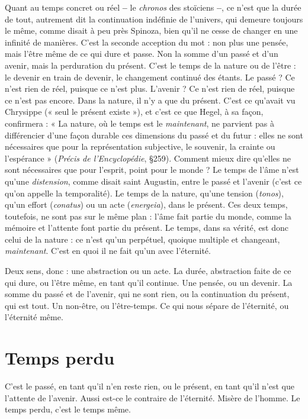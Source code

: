 Quant au temps concret ou réel {\bf --} le {\it chronos} des stoïciens {\bf --}, ce n’est que la
durée de tout, autrement dit la continuation indéfinie de l’univers, qui
demeure toujours le même, comme disait à peu près Spinoza, bien qu’il ne
cesse de changer en une infinité de manières. C’est la seconde acception du
mot : non plus une pensée, mais l'être même de ce qui dure et passe. Non la
somme d’un passé et d’un avenir, mais la perduration du présent. C’est le
temps de la nature ou de l’être : le devenir en train de devenir, le changement
continué des étants. Le passé ? Ce n’est rien de réel, puisque ce n’est plus.
L'avenir ? Ce n’est rien de réel, puisque ce n’est pas encore. Dans la nature, il
n’y a que du présent. C’est ce qu'avait vu Chrysippe (« seul le présent existe »),
et c’est ce que Hegel, à sa façon, confirmera : « La nature, où le temps est le
{\it maintenant}, ne parvient pas à différencier d’une façon durable ces dimensions
du passé et du futur : elles ne sont nécessaires que pour la représentation subjective,
le souvenir, la crainte ou l’espérance » ({\it Précis de l'Encyclopédie}, \S 259).
Comment mieux dire qu’elles ne sont nécessaires que pour l’esprit, point pour
le monde ? Le temps de l’âme n’est qu’une {\it distension}, comme disait saint
Augustin, entre le passé et l’avenir (c’est ce qu’on appelle la temporalité). Le
temps de la nature, qu’une tension ({\it tonos}), qu’un effort ({\it conatus}) ou un acte
({\it energeia}), dans le présent. Ces deux temps, toutefois, ne sont pas sur le même
plan : l’âme fait partie du monde, comme la mémoire et l'attente font partie du
présent. Le temps, dans sa vérité, est donc celui de la nature : ce n’est qu’un
perpétuel, quoique multiple et changeant, {\it maintenant}. C’est en quoi il ne fait
qu’un avec l'éternité.

Deux sens, donc : une abstraction ou un acte. La durée, abstraction faite de
ce qui dure, ou l’être même, en tant qu’il continue. Une pensée, ou un devenir.
La somme du passé et de l'avenir, qui ne sont rien, ou la continuation du présent,
qui est tout. Un non-être, ou l’être-temps. Ce qui nous sépare de l’éternité,
ou l'éternité même.

\section{Temps perdu}
C'est le passé, en tant qu’il n’en reste rien, ou le présent, en
tant qu’il n’est que l'attente de l’avenir. Aussi est-ce le
contraire de l'éternité. Misère de l’homme. Le temps perdu, c’est le temps
même.


